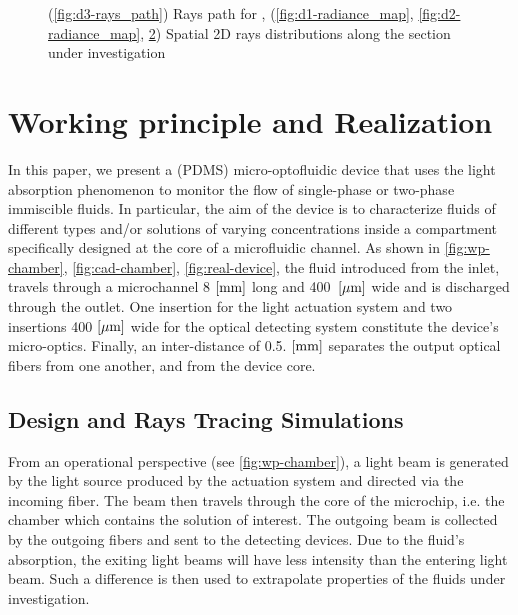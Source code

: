 \documentclass[sn-mathphys]{sn-jnl}
\theoremstyle{thmstyleone}%
\theoremstyle{thmstyletwo}%
\theoremstyle{thmstylethree}%
\begin{document}
\begin{figure}
\begin{subfigure}[b]{0.8\columnwidth}
		\caption{}
		\label{fig:d3-radiance_map}
	\end{subfigure}
	\caption{(\ref{fig:d3-rays_path}) Rays path for ,  (\ref{fig:d1-radiance_map}, \ref{fig:d2-radiance_map}, \ref{fig:d3-radiance_map}) Spatial 2D rays distributions along the section under investigation}
\end{figure}

\section{Working principle and Realization}
In this paper, we present a (PDMS) micro-optofluidic device that uses the light absorption phenomenon to monitor the flow of single-phase or two-phase immiscible fluids. In particular, the aim of the device is to characterize fluids of different types and/or solutions of varying concentrations inside a compartment specifically designed at the core of a microfluidic channel. As shown in \fig\ref{fig:wp-chamber}, \ref{fig:cad-chamber},  \ref{fig:real-device}, the fluid introduced from the inlet, travels through a microchannel 8 $[\rm mm]$ long and 400~$[\rm \mu m]$ wide and is discharged through the outlet. One insertion for the light actuation system and two insertions 400 $[\rm \mu m]$ wide for the optical detecting system constitute the device's micro-optics. Finally, an inter-distance of 0.5. $[\rm mm]$ separates the output optical fibers from one another, and from the device core.


\subsection{Design and Rays Tracing Simulations}
From an operational perspective (see \fig\ref{fig:wp-chamber}), a light beam is generated by the light source produced by the actuation system and directed via the incoming fiber. The beam then travels through the core of the microchip, i.e. the chamber which contains the solution of interest. The outgoing beam is collected by the outgoing fibers and sent to the detecting devices. Due to the fluid's absorption, the exiting light beams will have less intensity than the entering light beam. Such a difference is then used to extrapolate properties of the fluids under investigation.
\end{document}
